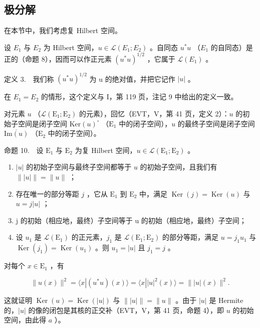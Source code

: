 \subsection{极分解}

在本节中，我们考虑复 Hilbert 空间。

设 \(E_{1}\) 与 \(E_{2}\) 为 Hilbert 空间，\(u \in \mathcal{L}(E_{1}; E_{2})\) 。自同态 \(u^{*}u\) （\(E_{1}\) 的自同态）是正的（命题 8），因而可以作正元素 \((u^{*}u)^{1/2}\) ，它属于 \(\mathcal{L}(E_{1})\) 。

定义 3.　我们称 \((u^{*}u)^{1/2}\) 为 u 的绝对值，并把它记作 \(|u|\) 。

在 \(E_{1} = E_{2}\) 的情形，这个定义与 I，第 119 页，注记 9 中给出的定义一致。

对元素 \(u\) （\(\mathcal{L}(\mathrm{E}_{1};\mathrm{E}_{2})\) 的元素），回忆（EVT，V，第 41 页，定义 2）：\(u\) 的初始子空间是闭子空间 \(\mathrm{Ker}(u)^{\circ}\) （\(\mathrm{E}_{1}\) 中的闭子空间），\(u\) 的最终子空间是闭子空间 \(\overline{\mathrm{Im}(u)}\) （\(\mathrm{E}_{2}\) 中的闭子空间）。

命题 10.　设 \(\mathrm{E}_1\) 与 \(\mathrm{E}_2\) 为复 Hilbert 空间，\(u \in \mathcal{L}(\mathrm{E}_1; \mathrm{E}_2)\) 。

\begin{enumerate}
\def\labelenumi{\alph{enumi})}
\item
  \(|u|\) 的初始子空间与最终子空间都等于 \(u\) 的初始子空间，且我们有 \(\| |u| \| = \| u\|\) ；
\item
  存在唯一的部分等距 \(j\) ，它从 \(\mathrm{E}_1\) 到 \(\mathrm{E}_2\) 中，满足 \(\operatorname{Ker}(j) = \operatorname{Ker}(u)\) 与 \(u = j|u|\) ；
\item
  j 的初始（相应地，最终）子空间等于 u 的初始（相应地，最终）子空间；
\item
  设 \(u_{1}\) 是 \(\mathcal{L}(\mathrm{E}_{1})\) 的正元素，\(j_{1}\) 是 \(\mathcal{L}(\mathrm{E}_{1};\mathrm{E}_{2})\) 的部分等距，满足 \(u = j_{1}u_{1}\) 与 \(\operatorname{Ker}(j_{1}) = \operatorname{Ker}(u_{1})\) 。则 \(u_{1} = |u|\) 且 \(j_{1} = j\) 。
\end{enumerate}

对每个 \(x\in \mathrm{E}_1\) ，有

\[
\| u (x) \| ^ {2} = \langle x | (u ^ {*} u) (x) \rangle = \langle x | | u | ^ {2} (x) \rangle = \| | u | (x) \| ^ {2}.\tag{2}
\]

这就证明 \(\operatorname{Ker}(u) = \operatorname{Ker}(|u|)\) 与 \(\| |u| \| = \|u\|\) 。由于 \(|u|\) 是 Hermite 的，\(|u|\) 的像的闭包是其核的正交补（EVT，V，第 41 页，命题 4），即 \(u\) 的初始空间，由此得 \(a\) ）。


